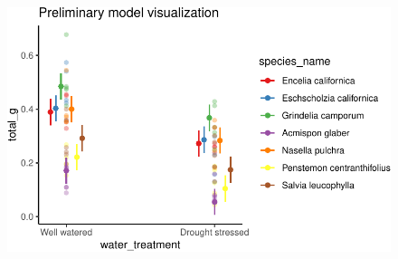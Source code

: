\documentclass[
  letterpaper,
  DIV=11,
  numbers=noendperiod]{scrartcl}
\begin{document}
\begin{figure}[H]

{\centering \includegraphics{Odile_Gabbiani_homework-03_files/figure-pdf/unnamed-chunk-15-1.pdf}

}

\end{figure}
\end{document}
